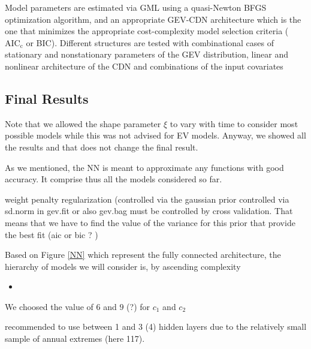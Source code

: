 Model parameters are estimated via GML using a quasi-Newton BFGS optimization algorithm, and an appropriate GEV-CDN architecture which is the one that minimizes the appropriate cost-complexity model selection criteria ($\text{AIC}_{\text{c}}$ or BIC). Different structures are tested with combinational cases of stationary and nonstationary parameters of the GEV distribution, linear and nonlinear architecture of the CDN and combinations of the input covariates 


\subsection*{Final Results}

Note that we allowed the shape parameter $\xi$ to vary with time to consider most possible models while this was not advised for EV models. Anyway, we showed all the results and that does not change the final result. 

As we mentioned, the NN is meant to approximate any functions with good accuracy. It comprise thus all the models considered so far.

weight penalty regularization (controlled via the gaussian prior controlled via sd.norm in gev.fit or also gev.bag must be controlled by cross validation. That means that we have to find the value of the variance for this prior that provide the best fit (aic or bic ? )



Based on Figure \ref{NN} which represent the fully connected architecture, the hierarchy of models we will consider is, by ascending complexity

\begin{itemize}
	\item 
\end{itemize}

We choosed the value of $6$ and $9$ (?) for $c_1$ and $c_2$

\citet{cannon_flexible_2010} recommended to use between 1 and 3 (4) hidden layers due to the relatively small sample of annual extremes (here 117).

